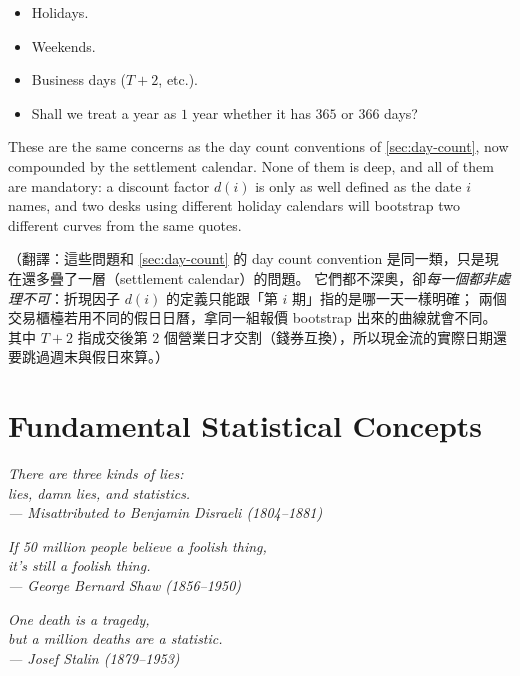 \begin{itemize}[nosep]
	\item Holidays.
	\item Weekends.
	\item Business days ($T+2$, etc.).
	\item Shall we treat a year as $1$ year whether it has $365$ or $366$ days?
\end{itemize}

\suppstart
\begin{note}
	These are the same concerns as the day count conventions of \autoref{sec:day-count}, now compounded by the settlement calendar.
	None of them is deep, and all of them are mandatory: a discount factor $d(i)$ is only as well defined as the date $i$ names, and two desks using different holiday calendars will bootstrap two different curves from the same quotes.

	（翻譯：這些問題和 \autoref{sec:day-count} 的 day count convention 是同一類，只是現在還多疊了一層（settlement calendar）的問題。
	它們都不深奧，卻\emph{每一個都非處理不可}：折現因子 $d(i)$ 的定義只能跟「第 $i$ 期」指的是哪一天一樣明確；
	兩個交易櫃檯若用不同的假日日曆，拿同一組報價 bootstrap 出來的曲線就會不同。
	其中 $T+2$ 指成交後第 $2$ 個營業日才交割（錢券互換），所以現金流的實際日期還要跳過週末與假日來算。）
\end{note}
\suppend

\chapter{Fundamental Statistical Concepts}


\begin{flushright}
	\itshape There are three kinds of lies:\\
	lies, damn lies, and statistics.\\
	\upshape --- Misattributed to Benjamin Disraeli (1804--1881)

	\medskip

	\itshape If 50 million people believe a foolish thing,\\
	it's still a foolish thing.\\
	\upshape --- George Bernard Shaw (1856--1950)

	\medskip

	\itshape One death is a tragedy,\\
	but a million deaths are a statistic.\\
	\upshape --- Josef Stalin (1879--1953)
\end{flushright}

